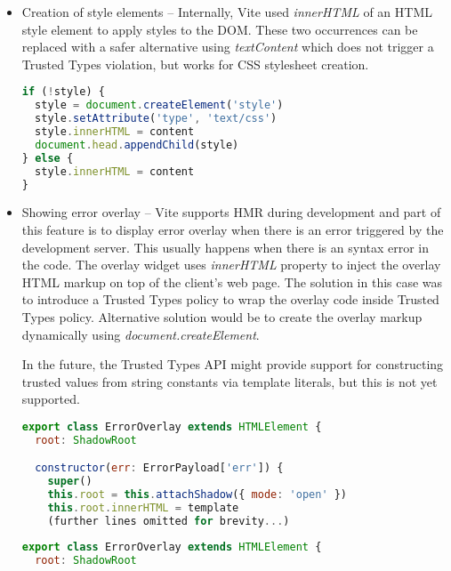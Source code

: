 \begin{itemize}
  \item Creation of style elements -- Internally, Vite used \textit{innerHTML} of an HTML style
        element to apply styles to the DOM. These two occurrences can be replaced with a
        safer alternative using \textit{textContent} which does not trigger a Trusted Types
        violation, but works for CSS stylesheet creation.

        \bigskip
        \begin{lstlisting}[language=JavaScript, caption=Creation of style elements using innerHTML in Vite \cite{commit_vite_inner_html_styles}]
if (!style) {
  style = document.createElement('style')
  style.setAttribute('type', 'text/css')
  style.innerHTML = content
  document.head.appendChild(style)
} else {
  style.innerHTML = content
}
\end{lstlisting}

  \item Showing error overlay -- Vite supports HMR during development and part of this feature is to
        display error overlay when there is an error triggered by the development server. This
        usually happens when there is an syntax error in the code. The overlay widget uses
        \textit{innerHTML} property to inject the overlay HTML markup on top of the client's web
        page. The solution in this case was to introduce a Trusted Types policy to wrap the overlay
        code inside Trusted Types policy. Alternative solution would be to create the overlay
        markup dynamically using \textit{document.createElement}.

        In the future, the Trusted Types API might provide support for constructing trusted values
        from string constants via template literals, but this is not yet supported.

        \bigskip
        \begin{lstlisting}[language=JavaScript, caption=Creation of error overlay using innerHTML property \cite{commit_vite_inner_html_overlay}]
export class ErrorOverlay extends HTMLElement {
  root: ShadowRoot

  constructor(err: ErrorPayload['err']) {
    super()
    this.root = this.attachShadow({ mode: 'open' })
    this.root.innerHTML = template
    (further lines omitted for brevity...)
\end{lstlisting}

        \bigskip
        \begin{lstlisting}[language=JavaScript, caption=Creation of error overlay using Trusted Types policy \cite{commit_vite_policy_overlay}]
export class ErrorOverlay extends HTMLElement {
  root: ShadowRoot


\end{lstlisting}
\end{itemize}
